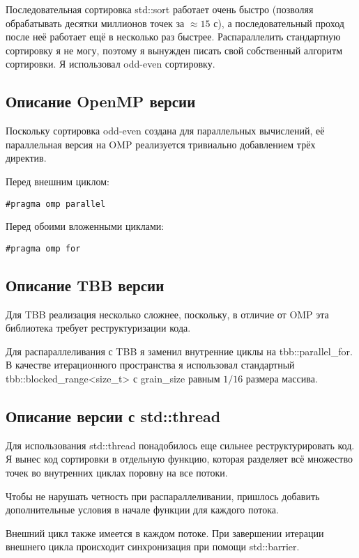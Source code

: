 \documentclass[a4paper,12pt]{article}
\begin{document}
Последовательная сортировка std::sort работает очень быстро (позволяя обрабатывать десятки миллионов точек за $\approx 15$ с), 
а последовательный проход после неё работает ещё в несколько раз быстрее. 
Распараллелить стандартную сортировку я не могу, поэтому я вынужден писать свой собственный алгоритм сортировки. 
Я использовал odd-even сортировку.

\subsection{Описание OpenMP версии}

Поскольку сортировка odd-even создана для параллельных вычислений, 
её параллельная версия на OMP реализуется тривиально добавлением 
трёх директив.

Перед внешним циклом:
\begin{lstlisting}
#pragma omp parallel
\end{lstlisting}

Перед обоими вложенными циклами:

\begin{lstlisting}
#pragma omp for
\end{lstlisting}

\subsection{Описание TBB версии}

Для TBB реализация несколько сложнее, поскольку, в отличие от OMP эта библиотека
требует реструктуризации кода. 

Для распараллеливания с TBB я заменил внутренние циклы на tbb::parallel\_for.
В качестве итерационного пространства я использовал стандартный tbb::blocked\_range<size\_t> с 
grain\_size равным $1/16$ размера массива.

\subsection{Описание версии с std::thread}
Для использования std::thread понадобилось еще сильнее реструктурировать код. 
Я вынес код сортировки в отдельную функцию, которая разделяет всё множество точек во внутренних циклах поровну на все потоки.

Чтобы не нарушать четность при распараллеливании, пришлось добавить дополнительные условия в начале 
функции для каждого потока. 

Внешний цикл также имеется в каждом потоке. При завершении итерации внешнего цикла происходит синхронизация
при помощи std::barrier.
\end{document}
